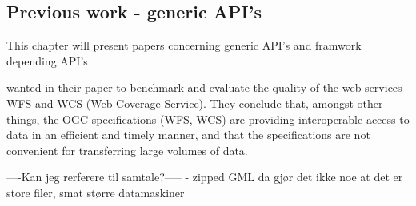 






\subsection{Previous work - generic API's}
This chapter will present papers concerning generic API's and framwork depending API's


\cite{giuliani2013} wanted in their paper to benchmark and evaluate the quality of the web services WFS and WCS (Web Coverage Service). They conclude that, amongst other things, the OGC specifications (WFS, WCS) are providing interoperable access to data in an efficient and timely manner, and that the specifications are not convenient for transferring large volumes of data. 

----Kan jeg rerferere til samtale?-----
- zipped GML da gjør det ikke noe at det er store filer, smat større datamaskiner






